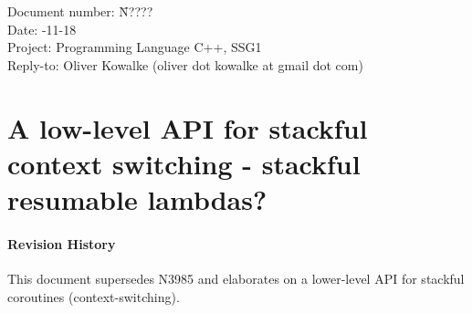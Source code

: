 \documentclass[a4paper,10pt,DIV15]{scrartcl}
\begin{document}
\small
\begin{tabbing}
    Document number: \= N????\\
    Date:            -11-18 \\
    Project:         \> Programming Language C++, SSG1\\
    Reply-to:        \> Oliver Kowalke (oliver dot kowalke at gmail dot com)\\
\end{tabbing}

\section*{A low-level API for stackful context switching - stackful resumable lambdas?}


\tableofcontents


\paragraph*{Revision History}
This document supersedes N3985 and elaborates on a lower-level API for stackful
coroutines (context-switching).












\end{document}

